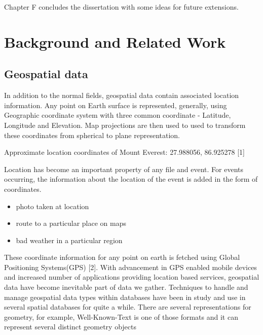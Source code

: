 \documentclass[article,type=msc,colorback,10pt,accentcolor=tud1d]{tudthesis}
\begin{document}
		Chapter F concludes the dissertation with some ideas for future extensions.   
		


	\clearpage

	\hfill
  \section{Background and Related Work}
  \hfill
	  
		   \subsection{Geospatial data }
			   \par In addition to the normal fields, geospatial data contain associated location information. Any point on Earth surface is represented, generally, using Geographic coordinate system with three common coordinate - Latitude, Longitude and Elevation. Map projections are then used to used to transform these coordinates from spherical to plane representation. 
			   
			   Approximate location coordinates of Mount Everest: 27.988056, 86.925278  [1] 
			   
			   Location has become an important property of any file and event. For events occurring, the information about the location of the event is added in the form of coordinates.   
			   
			   \begin{itemize}
			   	\item photo taken at location
			   	\item route to a particular place on maps
			   	\item bad weather in a particular region
			   	
			   \end{itemize}
			   
			   These coordinate information for any point on earth is fetched using Global Positioning Systems(GPS) [2]. With advancement in GPS enabled mobile devices and increased number of applications providing location based services, geospatial data have become inevitable part of data we gather. Techniques to handle and manage geospatial data types within databases have been in study and use in several spatial databases for quite a while. There are several representations for geometry, for example, Well-Known-Text is one of those formats and it can represent several distinct geometry objects 
			   
\end{document}
